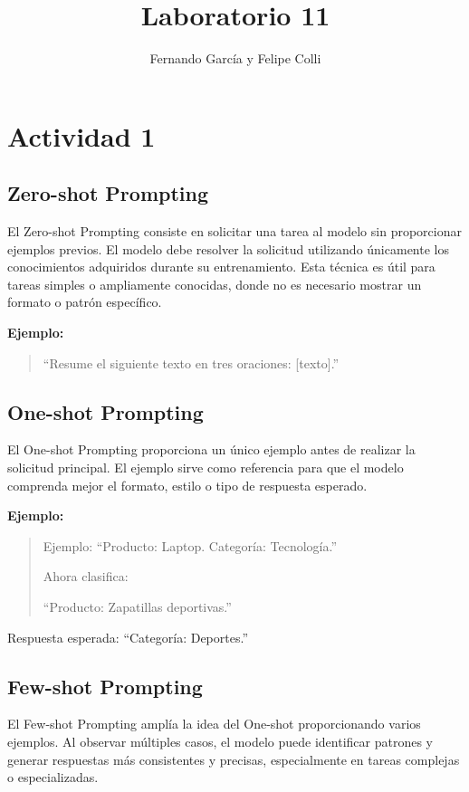\documentclass[12pt,a4paper]{article}
\title{Laboratorio 11}
\author{Fernando García y Felipe Colli}
\date{}
\begin{document}
\maketitle

\section{Actividad 1}
\subsection{ Zero-shot Prompting}

El Zero-shot Prompting consiste en solicitar una tarea al modelo sin proporcionar ejemplos previos. El modelo debe resolver la solicitud utilizando únicamente los conocimientos adquiridos durante su entrenamiento. Esta técnica es útil para tareas simples o ampliamente conocidas, donde no es necesario mostrar un formato o patrón específico.

\textbf{Ejemplo:}

\begin{quote}
``Resume el siguiente texto en tres oraciones: [texto].''
\end{quote}

\subsection{ One-shot Prompting}

El One-shot Prompting proporciona un único ejemplo antes de realizar la solicitud principal. El ejemplo sirve como referencia para que el modelo comprenda mejor el formato, estilo o tipo de respuesta esperado.

\textbf{Ejemplo:}

\begin{quote}
Ejemplo: ``Producto: Laptop. Categoría: Tecnología.''

Ahora clasifica:

``Producto: Zapatillas deportivas.''
\end{quote}

Respuesta esperada: ``Categoría: Deportes.''

\subsection{Few-shot Prompting}

El Few-shot Prompting amplía la idea del One-shot proporcionando varios ejemplos. Al observar múltiples casos, el modelo puede identificar patrones y generar respuestas más consistentes y precisas, especialmente en tareas complejas o especializadas.
\end{document}
